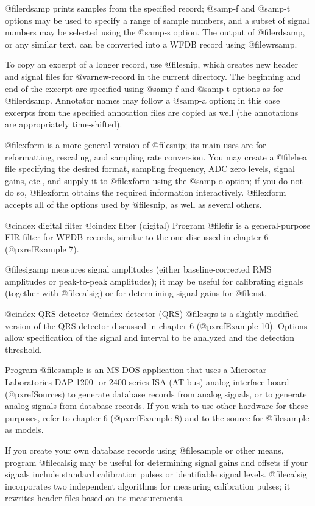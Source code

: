 {{{{{{{{{@file{rdsamp} prints samples from the specified record;  @samp{-f} and
@samp{-t} options may be used to specify a range of sample numbers, and
a subset of signal numbers may be selected using the @samp{-s}
option.  The output of @file{rdsamp}, or any similar text, can be
converted into a WFDB record using @file{wrsamp}.

To copy an excerpt of a longer record, use @file{snip}, which creates
new
header and signal files for @var{new-record} in the current directory.
The beginning and end of the excerpt are specified using @samp{-f} and
@samp{-t} options as for @file{rdsamp}.  Annotator names may follow a @samp{-a}
option; in this case excerpts from the specified annotation files are copied as
well (the annotations are appropriately time-shifted).

@file{xform} is a more general version of @file{snip}; its main uses are for
reformatting, rescaling, and sampling rate conversion.  You may create a
@file{hea} file specifying the desired format, sampling frequency, ADC zero
levels, signal gains, etc., and supply it to @file{xform} using the @samp{-o}
option; if you do not do so, @file{xform} obtains the required information
interactively.  @file{xform} accepts all of the options used by @file{snip},
as well as several others.

@cindex digital filter
@cindex filter (digital)
Program @file{fir} is a general-purpose FIR filter for WFDB records,
similar to the one discussed in chapter 6 (@pxref{Example 7}).

@file{sigamp} measures signal amplitudes (either baseline-corrected RMS
amplitudes or peak-to-peak amplitudes);  it may be useful for calibrating
signals (together with @file{calsig}) or for determining signal gains
for @file{nst}.

@cindex QRS detector
@cindex detector (QRS)
@file{sqrs} is a slightly modified version of the QRS detector
discussed in chapter 6 (@pxref{Example 10}).  Options allow
specification of the signal and interval to be analyzed and the
detection threshold.

Program @file{sample} is an MS-DOS application that uses a Microstar
Laboratories DAP 1200- or 2400-series ISA (AT bus) analog interface
board (@pxref{Sources}) to generate database records from analog
signals, or to generate analog signals from database records.  If you
wish to use other hardware for these purposes, refer to chapter 6
(@pxref{Example 8}) and to the source for @file{sample} as
models.

If you create your own database records using @file{sample} or other
means, program @file{calsig} may be useful for determining signal
gains and offsets if your signals include standard calibration pulses or
identifiable signal levels. @file{calsig} incorporates two
independent algorithms for measuring calibration pulses; it rewrites
header files based on its measurements.

}}}}}}}}}
